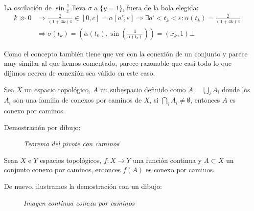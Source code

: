 \begin{ej}
\begin{enumerate}
\begin{demo}
            La oscilación de $\sin \frac{1}{x}$ lleva $\sigma$ a $\{y = 1\}$, fuera de la bola elegida:
            \begin{align*}
            k \gg 0 &\Rightarrow \frac{2}{\left( 1 + 4k \right) \pi} \in \left[ 0, c \right] = \alpha\left[ a', \varepsilon \right] \Rightarrow \exists a' < t_k < \varepsilon: \alpha\left( t_k \right) = \frac{2}{\left( 1 + 4k \right) \pi}\\ 
                &\Rightarrow \sigma\left( t_k \right) = \left( \alpha\left( t_k \right), \sin\left( \frac{1}{\alpha\left( t_k \right)} \right) \right) = \left( x_k, 1 \right) 
            \bot \end{align*}
    \end{demo}
\end{enumerate}
\end{ej}

Como el concepto también tiene que ver con la conexión de un conjunto y parece muy similar al que hemos comentado, parece razonable que casi todo lo que dijimos acerca de conexión sea válido en este caso.

\begin{theo}
Sea $X$ un espacio topológico, $A$ un subespacio definido como $A = \bigcup_{i} A_i$ donde los $A_i$ son una familia de conexos por caminos de $X$, si $\bigcap_{i} A_i \neq \emptyset$, entonces $A$ es conexo por caminos. 
\end{theo}
\begin{demo}
Demostración por dibujo:
\begin{figure}[H]
    \centering
    \caption{\textit{Teorema del pivote con caminos}}
    \label{fig:teorema-del-pivote-caminos}
\end{figure}
\end{demo}

\begin{theo}
Sean $X$ e $Y$ espacios topológicos, $f: X \rightarrow Y$ una función continua y $A \subset X$ un conjunto conexo por caminos, entonces $f\left( A \right)$ es conexo por caminos.
\end{theo}
\begin{demo}
De nuevo, ilustramos la demostración con un dibujo:
\begin{figure}[H]
    \centering
    \caption{\textit{Imagen continua conexa por caminos}}
    \label{fig:imagen-conexa-por-caminos}
\end{figure}
\end{demo}

